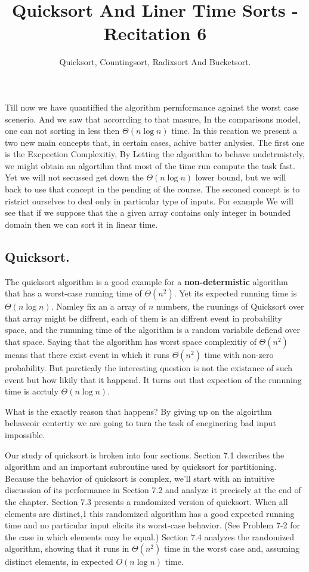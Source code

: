 \title{Quicksort And Liner Time Sorts  - Recitation 6} 
\author{Quicksort, Countingsort, Radixsort And Bucketsort.}


Till now we have quantiffied the algorithm permformance against the worst case scenerio. And we saw that accorrding to that masure, In the comparisons model, one can not sorting in less then $\Theta\left( n\log n \right) $ time.  In this recation we present a two new main concepts that, in certain cases, achive batter anlysies. The first one is the Excpection Complexitiy, By Letting the algorithm to behave undetrmistcly, we might obtain an algortihm that most of the time run compute the task fast. Yet we will not secussed get down the $\Theta\left(n\log n\right)$ lower bound, but we will back to use that concept in the pending of the course. The seconed concept is to ristrict ourselves to deal only in particular type of inputs. For example We will see that if we suppose that the a given array contains only integer in bounded domain then we can sort it in linear time.  


\subsection{Quicksort.}
The quicksort algorithm is a good example for a \textbf{non-determistic} algorithm that has a worst-case running time of $\Theta\left(n^{2}\right)$. Yet its expected running time is $\Theta\left(n\log n\right)$. Namley fix an a array of $n$ numbers, the ruunings of Quicksort over that array might be diffrent, each of them is an diffrent event in probability space, and the rununing time of the algorithm is a random variabile defiend over that space. Saying that the algorithm has worst space complexitiy of $\Theta(n^{2})$ means that there exist event in which it runs $\Theta\left(n^{2}\right)$ time with non-zero probability. But parcticaly the interesting question is not the existance of such event but how likily that it happend. It turns out that  expection of the runnning time is acctuly $\Theta\left(n\log n\right)$.  

What is the exactly reason that happens? By giving up on the algoirthm behaveoir centertiy we are going to turn the task of eneginering bad input impossible.    

Our study of quicksort is broken into four sections. Section 7.1 describes the algorithm and an important subroutine used by quicksort for partitioning. Because the behavior of quicksort is complex, we’ll start with an intuitive discussion of its performance in Section 7.2 and analyze it precisely at the end of the chapter. Section 7.3 presents a randomized version of quicksort. When all elements are distinct,1 this randomized algorithm has a good expected running time and no particular input elicits its worst-case behavior. (See Problem 7-2 for the case in which elements may be equal.) Section 7.4 analyzes the randomized algorithm, showing that it runs in $\Theta(n^2)$ time in the worst case and, assuming distinct elements, in expected $O\left(n\log n\right)$ time.
  
